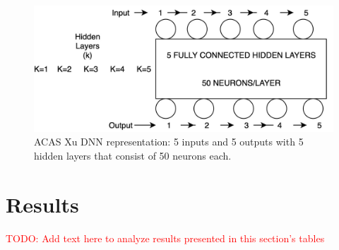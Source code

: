 \begin{figure}
	\centering
	\includegraphics[width=0.7\linewidth]{Images/ACASXuDNN}
	\caption[ACAS Xu DNN]{ACAS Xu DNN representation: 5 inputs and 5 outputs with 5 hidden layers that consist of 50 neurons each.}
	\label{fig:acasxudnn}
\end{figure}



\section{Results}
\textcolor{red}{TODO: Add text here to analyze results presented in this section's tables}